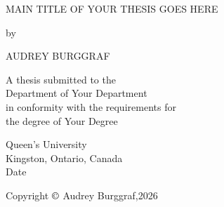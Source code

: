 \begin{titlepage}
    \begin{center}
            
       

        \large \uppercase{
        {Main Title of your thesis goes here}}

        \vspace{1.5cm}

        by
            
        \vspace{1.5cm}
            
        \large{\uppercase{Audrey Burggraf}}
            
        \vspace{1.5cm}
            
        \normalsize A thesis submitted to the \\
        Department of Your Department \\
        in conformity with the requirements for \\
        the degree of Your Degree
            
        \vspace{1.0cm}
            
            
        
        Queen's University\\
        Kingston, Ontario, Canada\\
        Date

        \vspace{1.0cm}

        Copyright $\copyright$ Audrey Burggraf,2026
            
    \end{center}
\end{titlepage}